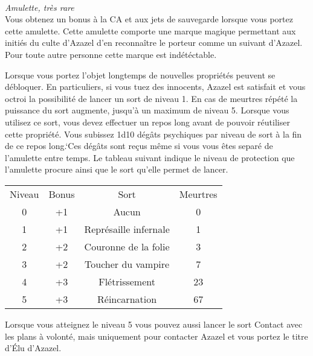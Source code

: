\\
{\small \it Amulette, très rare}\\
\label{AmuletteAzazel}
Vous obtenez un bonus à la CA et aux jets de sauvegarde lorsque vous 
portez cette amulette. Cette amulette comporte une marque magique permettant
aux initiés du culte d'Azazel d'en reconnaître le porteur comme un suivant
d'Azazel. Pour toute autre personne cette marque est indétéctable.

Lorsque vous portez l'objet longtemps de nouvelles propriétés peuvent se 
débloquer. En particuliers, si vous tuez des innocents, Azazel est satisfait 
et vous octroi la possibilité de lancer un sort de niveau 1. En cas de meurtres 
répété la puissance du sort augmente, jusqu'à un maximum de niveau 5.
Lorsque vous utilisez ce sort, vous devez effectuer un repos long avant de
pouvoir réutiliser cette propriété. Vous subissez 1d10 dégâts psychiques par niveau de sort à
la fin de ce repos long.`Ces dégâts sont 
reçus même si vous vous êtes separé de l'amulette entre temps.
Le tableau suivant indique le niveau de protection que l'amulette procure ainsi que
le sort qu'elle permet de lancer.

\begin{center}
\setlength{\tabcolsep}{4pt}
\begin{tabular}{cccc}
Niveau & Bonus & Sort & Meurtres \\
   \rowcolor{LightCyan}
 0 & +1 & Aucun & 0  \\
 1 & +1 & Représaille infernale & 1 \\
   \rowcolor{LightCyan}
 2 & +2 & Couronne de la folie & 3 \\
 3 & +2 & Toucher du vampire & 7 \\
   \rowcolor{LightCyan}
 4 & +3 & Flétrissement & 23 \\
 5 & +3 & Réincarnation & 67 \\
\end{tabular}
\end{center}

Lorsque vous atteignez le niveau 5 vous pouvez aussi lancer le sort Contact avec 
les plans à volonté, mais uniquement pour contacter Azazel et vous portez le titre d'Élu d'Azazel.
